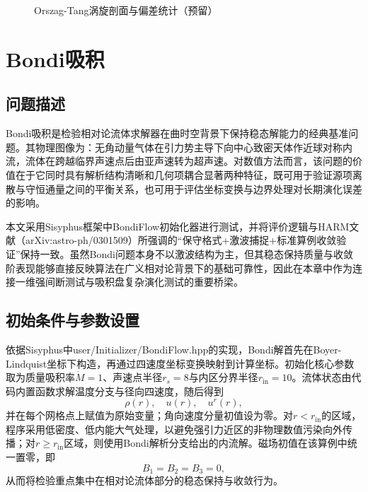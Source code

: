 \begin{figure}[htbp]
	\centering
	\caption{Orszag-Tang涡旋剖面与偏差统计（预留）}
	\label{fig:ot-slice-placeholder}
\end{figure}

\section{Bondi吸积}
\subsection{问题描述}
Bondi吸积是检验相对论流体求解器在曲时空背景下保持稳态解能力的经典基准问题。其物理图像为：无角动量气体在引力势主导下向中心致密天体作近球对称内流，流体在跨越临界声速点后由亚声速转为超声速。对数值方法而言，该问题的价值在于它同时具有解析结构清晰和几何项耦合显著两种特征，既可用于验证源项离散与守恒通量之间的平衡关系，也可用于评估坐标变换与边界处理对长期演化误差的影响。

本文采用Sisyphus框架中BondiFlow初始化器进行测试，并将评价逻辑与HARM文献（arXiv:astro-ph/0301509）所强调的“保守格式+激波捕捉+标准算例收敛验证”保持一致。虽然Bondi问题本身不以激波结构为主，但其稳态保持质量与收敛阶表现能够直接反映算法在广义相对论背景下的基础可靠性，因此在本章中作为连接一维强间断测试与吸积盘复杂演化测试的重要桥梁。

\subsection{初始条件与参数设置}
依据Sisyphus中user/Initializer/BondiFlow.hpp的实现，Bondi解首先在Boyer-Lindquist坐标下构造，再通过四速度坐标变换映射到计算坐标。初始化核心参数取为质量吸积率$\dot{M}=1$、声速点半径$ r_s=8 $与内区分界半径$ r_{\mathrm{in}}=10 $。流体状态由代码内置函数求解温度分支与径向四速度，随后得到
\[
\rho(r),\quad u(r),\quad u^r(r),
\]
并在每个网格点上赋值为原始变量；角向速度分量初值设为零。对$r<r_{\mathrm{in}}$的区域，程序采用低密度、低内能大气处理，以避免强引力近区的非物理数值污染向外传播；对$r\ge r_{\mathrm{in}}$区域，则使用Bondi解析分支给出的内流解。磁场初值在该算例中统一置零，即
\[
B_1=B_2=B_3=0,
\]
从而将检验重点集中在相对论流体部分的稳态保持与收敛行为。

